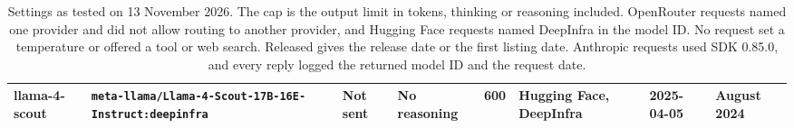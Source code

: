 \begin{table}[t]
\begin{adjustbox}{max width=\linewidth}
\begin{tabular}{P{0.10}P{0.21}P{0.13}P{0.12}rP{0.13}P{0.08}P{0.08}}
llama-4-scout & \texttt{meta-\allowbreak{}llama/\allowbreak{}Llama-\allowbreak{}4-\allowbreak{}Scout-\allowbreak{}17B-\allowbreak{}16E-\allowbreak{}Instruct:\allowbreak{}deepinfra} & Not sent & No reasoning & 600 & Hugging Face, DeepInfra & 2025-04-05 & August 2024 \\
\bottomrule
\end{tabular}
\end{adjustbox}
\caption{Settings as tested on 13 November 2026. The cap is the output limit in tokens, thinking or reasoning included. OpenRouter requests named one provider and did not allow routing to another provider, and Hugging Face requests named DeepInfra in the model ID. No request set a temperature or offered a tool or web search. Released gives the release date or the first listing date. Anthropic requests used SDK 0.85.0, and every reply logged the returned model ID and the request date.}
\label{tab:models}
\end{table}
